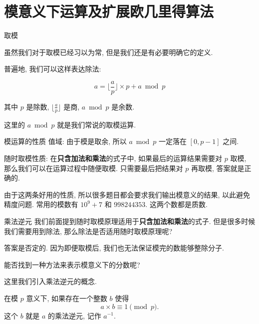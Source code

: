 \documentclass[aspectratio=169]{beamer}  %
\newcommand{\pau}{\pause}
\begin{document}
\section{模意义下运算及扩展欧几里得算法}

\begin{frame}{取模}

  虽然我们对于取模已经习以为常, 但是我们还是有必要明确它的定义.\pau

  \vspace{1em}

  普遍地, 我们可以这样表达除法: 

  $$a = \lfloor \frac{a}{p} \rfloor \times p + a \bmod p$$

  其中 $p$ 是除数, $\lfloor \frac{a}{p} \rfloor$ 是商, $a \bmod p$ 是余数.

  \vspace{1em}
  
  这里的 $a \bmod p$ 就是我们常说的取模运算.
\end{frame}

\begin{frame}{模运算的性质}  
  值域: 由于模是取余, 所以 $a \bmod p$ 一定落在 $[0,p-1]$ 之间.\pau

  \vspace{1em}

  随时取模性质: 在\textbf{只含加法和乘法}的式子中, 如果最后的运算结果需要对 $p$ 取模, 那么我们可以在运算过程中随便取模.
  只需要最后把结果对 $p$ 再取模, 答案就是正确的.\pau

  \vspace{1em}

  由于这两条好用的性质, 所以很多题目都会要求我们输出模意义的结果, 以此避免精度问题.
  常用的模数有 $10^9 + 7$ 和 $998244353$. 这两个数都是质数.
\end{frame}

\begin{frame}{乘法逆元}
  我们前面提到随时取模原理适用于\textbf{只含加法和乘法}的式子.
  但是很多时候我们需要用到除法, 那么除法是否适用随时取模原理呢?\pau
  
  \vspace{1em}

  答案是否定的. 因为即便取模后, 我们也无法保证模完的数能够整除分子.\pau

  \vspace{1em}

  能否找到一种方法来表示模意义下的分数呢?\pau

  \vspace{1em}

  这里我们引入乘法逆元的概念. 
  
  \begin{definition}
    在模 $p$ 意义下, 如果存在一个整数 $b$ 使得
    $$a \times b \equiv 1 \pmod{p} \text{.}$$
    这个 $b$ 就是 $a$ 的乘法逆元, 记作 $a^{-1}$.
  \end{definition}
\end{frame}
\end{document}
